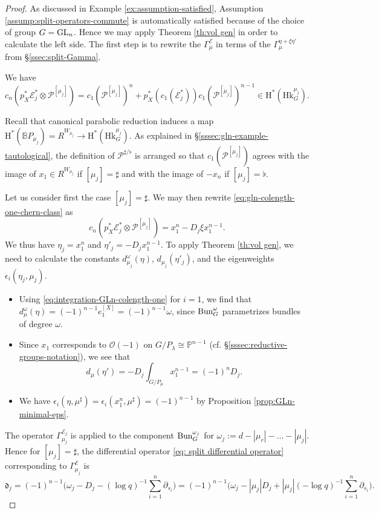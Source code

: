 \documentclass[reqno]{amsart}
\numberwithin{equation}{subsection}
\theoremstyle{definition}
\def\BB{\mathbb{B}}
\def\PP{\mathbb{P}}
\newcommand\cE{\mathcal{E}}
\newcommand\cO{\mathcal{O}}
\newcommand\cP{\mathcal{P}}
\newcommand\frd{\mathfrak{d}}
\newcommand{\Bun}{\textup{Bun}}
\newcommand\Hk{\mathrm{Hk}}
\newcommand\GL{\textup{GL}}
\newcommand\pl{\partial}
\newcommand{\rH}{\ensuremath{\mathrm{H}}\xspace}
\begin{document}
\begin{proof} As discussed in Example \ref{ex:assumption-satisfied}, Assumption \ref{assump:split-operators-commute} is automatically satisfied because of the choice of group $G = \GL_n$. Hence we may apply Theorem \ref{th:vol gen} in order to calculate the left side. The first step is to rewrite the $\Gamma^{\cE}_{\mu}$ in terms of the $\Gamma_{\mu}^{\eta + \xi \eta'}$ from \S\ref{ssec:split-Gamma}. 

We have
\begin{equation}\label{eq:gln-colength-one-chern-class}
c_n(p_X^* \cE_j^* \otimes \cP^{[\mu_j]}) = c_1(\cP^{[\mu_j]})^n  +  p_X^*(c_1(\cE_j^*)) c_1(\cP^{[\mu_j]})^{n-1} \in \rH^*(\Hk_G^{\mu_j}).
\end{equation}

Recall that canonical parabolic reduction induces a map $\rH^*(\BB P_{\mu_j}) = R^{W_{\mu_j}} \rightarrow \rH^*(\Hk_G^{\mu_j})$. As explained in \S \ref{sssec:gln-example-tautological}, the definition of $\cP^{\sharp/\flat}$ is arranged so that $c_1(\cP^{[\mu_j]})$ agrees with the image of $x_1 \in R^{W_{\mu_j}}$ if $[\mu_j] = \sharp$ and with the image of $-x_n$ if $[\mu_j] = \flat$. 

Let us consider first the case $[\mu_j] = \sharp$. We may then rewrite \eqref{eq:gln-colength-one-chern-class} as 
\[
c_n(p_X^* \cE_j^* \otimes \cP^{[\mu_j]}) = x_1^n - D_j \xi  x_1^{n-1}. 
\]
We thus have $\eta_j = x_1^n$ and $\eta'_j = - D_j x_1^{n-1}$. To apply Theorem \ref{th:vol gen}, we need to calculate the constants $d_{\mu_j}^\omega(\eta)$, $d_{\mu_j}(\eta'_j)$, and the eigenweights $\epsilon_i(\eta_j, \mu_j)$. 
\begin{itemize}

\item Using \eqref{eq:integration-GLn-colength-one} for $i=1$, we find that $d_{\mu}^\omega (\eta) = (-1)^{n-1} e_1^{[X]} = (-1)^{n-1} \omega$, since $\Bun_G^\omega$ parametrizes bundles of degree $\omega$.

 
\item Since $x_1$ corresponds to $\cO(-1)$ on $G/P_\lambda \cong \PP^{n-1}$ (cf. \S \ref{sssec:reductive-groups-notation}), we see that 
\[
d_{\mu}(\eta') =  -D_j \int_{G/P_\mu} x_1^{n-1} = (-1)^n D_j. 
\]

\item We have $\epsilon_i(\eta, \mu^\sharp) = \epsilon_i(x_1^n, \mu^\sharp) = (-1)^{n-1}$ by Proposition \ref{prop:GLn-minimal-eps}.

\end{itemize}
The operator $\Gamma^{\cE_j}_{\mu_j}$ is applied to the component $\Bun_G^{\omega_j}$ for $\omega_j := d - |\mu_r| - \ldots - |\mu_j|$. Hence for $[\mu_j] = \sharp$, the differential operator \eqref{eq: split differential operator} corresponding to $\Gamma^{\cE}_{\mu_j}$ is 
\begin{equation*}
\frd_{j} = (-1)^{n-1}\Big(\omega_j  -   D_j  - (\log q)^{-1}\sum_{i=1}^{n} \pl_{s_{i}} \Big)  = (-1)^{n-1} \Big(\omega_j - |\mu_j|  D_j + |\mu_j|  (- \log q)^{-1}\sum_{i=1}^{n} \pl_{s_{i}}  \Big).
\end{equation*}


\end{proof}
\end{document}
